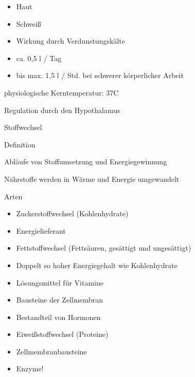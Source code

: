 \documentclass{article}
\begin{document}
\begin{itemize}
\item Haut

\item Schwei{\ss}

\end{itemize}
\begin{itemize}
\item Wirkung durch Verdunstungsk\"alte

\item ca. 0,5 l / Tag

\item bis max. 1,5 l / Std. bei schwerer k\"orperlicher  Arbeit

\end{itemize}
physiologische Kerntemperatur: 37{\textdegree}C

Regulation durch den Hypothalamus

Stoffwechsel

 Definition 

Abl\"aufe von Stoffumsetzung und  Energiegewinnung

N\"ahrstoffe werden in W\"arme und Energie  umgewandelt

Arten

\begin{itemize}
\item Zuckerstoffwechsel (Kohlenhydrate)

\end{itemize}
\begin{itemize}
\item Energielieferant 

\end{itemize}
\begin{itemize}
\item Fettstoffwechsel (Fetts\"auren, ges\"attigt und  unges\"attigt)

\end{itemize}
\begin{itemize}
\item Doppelt so hoher Energiegehalt wie  Kohlenhydrate

\item L\"osungsmittel f\"ur Vitamine

\item Bausteine der Zellmembran

\item Bestandteil von Hormonen

\end{itemize}
\begin{itemize}
\item Eiwei{\ss}stoffwechsel (Proteine)

\end{itemize}
\begin{itemize}
\item Zellmembranbausteine

\item Enzyme!

\end{itemize}
\end{document}
